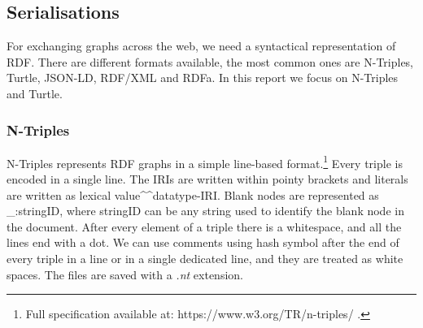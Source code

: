 

\subsection{Serialisations}
For exchanging graphs across the web, we need a syntactical representation of RDF. There are different formats available, the most common ones are N-Triples, Turtle, JSON-LD, RDF/XML and RDFa. In this report we focus on N-Triples and Turtle.

\subsubsection{N-Triples}
N-Triples represents RDF graphs in a simple line-based format.\footnote{Full specification available at: https://www.w3.org/TR/n-triples/ .} Every triple is encoded in a single line. The IRIs are written within pointy brackets and literals are written as lexical value\textasciicircum \textasciicircum datatype-IRI. Blank nodes are represented as \_:stringID, where stringID can be any string used to identify the blank node in the document. After every element of a triple there is a whitespace, and all the lines end with a dot. We can use comments using hash symbol after the end of every triple in a line or in a single dedicated line, and they are treated as white spaces. The files are saved with a \textit{.nt} extension.

